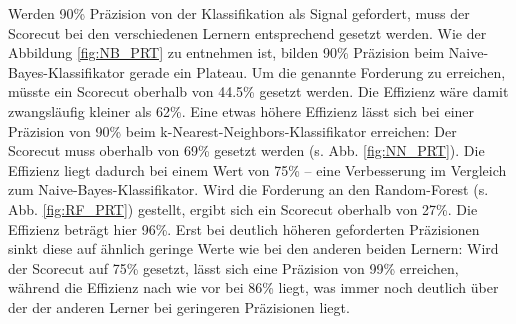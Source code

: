Werden 90\% Präzision von der Klassifikation als Signal gefordert, muss der Scorecut bei den verschiedenen Lernern entsprechend gesetzt werden. Wie der Abbildung \ref{fig:NB_PRT} zu entnehmen ist, bilden 90\% Präzision beim Naive-Bayes-Klassifikator gerade ein Plateau. Um die genannte Forderung zu erreichen, müsste ein Scorecut oberhalb von 44.5\% gesetzt werden. Die Effizienz wäre damit zwangsläufig kleiner als 62\%. Eine etwas höhere Effizienz lässt sich bei einer Präzision von 90\% beim k-Nearest-Neighbors-Klassifikator erreichen: Der Scorecut muss oberhalb von 69\% gesetzt werden (s. Abb. \ref{fig:NN_PRT}). Die Effizienz liegt dadurch bei einem Wert von 75\% -- eine Verbesserung im Vergleich zum Naive-Bayes-Klassifikator. Wird die Forderung an den Random-Forest (s. Abb. \ref{fig:RF_PRT}) gestellt, ergibt sich ein Scorecut oberhalb von 27\%. Die Effizienz beträgt hier 96\%. Erst bei deutlich höheren geforderten Präzisionen sinkt diese auf ähnlich geringe Werte wie bei den anderen beiden Lernern: Wird der Scorecut auf 75\% gesetzt, lässt sich eine Präzision von 99\% erreichen, während die Effizienz nach wie vor bei 86\% liegt, was immer noch deutlich über der der anderen Lerner bei geringeren Präzisionen liegt.